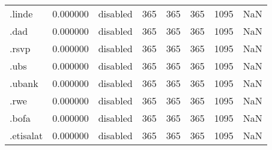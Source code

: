 \begin{tabular}{lrlrrrrl}
.linde                    &          0.000000 &        disabled &                         365 &                         365 &                         365 &                1095 &                  NaN \\
.dad                      &          0.000000 &        disabled &                         365 &                         365 &                         365 &                1095 &                  NaN \\
.rsvp                     &          0.000000 &        disabled &                         365 &                         365 &                         365 &                1095 &                  NaN \\
.ubs                      &          0.000000 &        disabled &                         365 &                         365 &                         365 &                1095 &                  NaN \\
.ubank                    &          0.000000 &        disabled &                         365 &                         365 &                         365 &                1095 &                  NaN \\
.rwe                      &          0.000000 &        disabled &                         365 &                         365 &                         365 &                1095 &                  NaN \\
.bofa                     &          0.000000 &        disabled &                         365 &                         365 &                         365 &                1095 &                  NaN \\
.etisalat                 &          0.000000 &        disabled &                         365 &                         365 &                         365 &                1095 &                  NaN \\
\bottomrule
\end{tabular}
